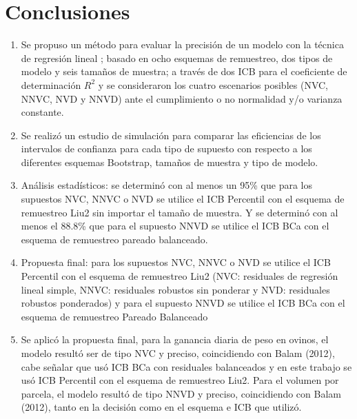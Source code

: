 \documentclass[serif, aspectratio=169]{beamer}
\begin{document}
\section{Conclusiones}
\begin{frame}
\begin{enumerate}
	\item 	Se propuso un método para evaluar la precisión de un modelo con la técnica de regresión lineal ; basado en ocho esquemas de remuestreo, dos tipos de modelo y seis tamaños de muestra; a través de dos ICB para el coeficiente de determinación $R^2$ y se consideraron los cuatro escenarios posibles (NVC, NNVC, NVD y NNVD) ante el cumplimiento o no normalidad y/o varianza constante.

	\item 	Se realizó un estudio de simulación para comparar las eficiencias de los intervalos de confianza para cada tipo de supuesto con respecto a los diferentes esquemas Bootstrap, tamaños de muestra y tipo de modelo.

	\item 	Análisis estadísticos: se determinó con al menos un 95\% que para los supuestos NVC, NNVC o NVD se utilice el ICB Percentil con el esquema de remuestreo Liu2 sin importar el tamaño de muestra. Y se determinó con al menos el 88.8\% que para el supuesto NNVD se utilice el ICB BCa con el esquema de remuestreo pareado balanceado.
\end{enumerate}
	

\end{frame}


\begin{frame}
	\begin{enumerate}
		\setcounter{enumi}{3}
		\item 	Propuesta final: para los supuestos NVC, NNVC o NVD se utilice el ICB Percentil con el esquema de remuestreo Liu2 (NVC: residuales de regresión lineal simple, NNVC: residuales robustos sin ponderar y NVD: residuales robustos ponderados) y para el supuesto NNVD se utilice el ICB BCa con el esquema de remuestreo Pareado Balanceado
		
		\item 	Se aplicó la propuesta final, para la ganancia diaria de peso en ovinos, el modelo resultó ser de tipo NVC y preciso, coincidiendo con Balam (2012), cabe señalar que usó ICB BCa con residuales balanceados y en este trabajo se usó ICB Percentil con el esquema de remuestreo Liu2. Para el volumen por parcela, el modelo resultó de tipo NNVD y preciso, coincidiendo con Balam (2012), tanto en la decisión como en el esquema e ICB que utilizó.
	\end{enumerate}
	
	
\end{frame}
\end{document}
